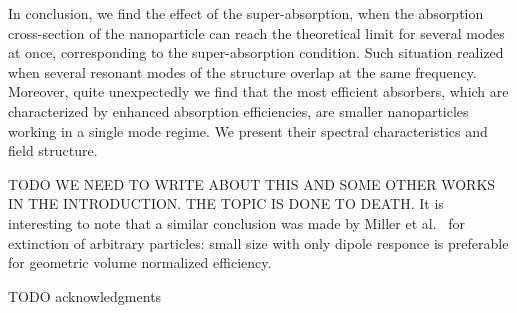 \documentclass[aps,prl,twocolumn,showpacs,superscriptaddress,groupedaddress]{revtex4-1}
\begin{document}
In conclusion, we find the effect of the super-absorption, when the
absorption cross-section of the nanoparticle can reach the theoretical
limit for several modes at once, corresponding to the super-absorption
condition. Such situation realized when several resonant modes of the
structure overlap at the same frequency. Moreover, quite unexpectedly
we find that the most efficient absorbers, which are characterized by
enhanced absorption efficiencies, are smaller nanoparticles working in
a single mode regime. We present their spectral characteristics and
field structure.


TODO
WE NEED TO WRITE ABOUT THIS AND SOME OTHER WORKS IN THE
INTRODUCTION. THE TOPIC IS DONE TO DEATH.  It is interesting to note
that a similar conclusion was made by Miller et al.~\cite{Miller-2014}
for extinction of arbitrary particles: small size with only dipole
responce is preferable for geometric volume normalized efficiency.


\begin{acknowledgments}

  TODO acknowledgments
\end{acknowledgments}


\end{document}
